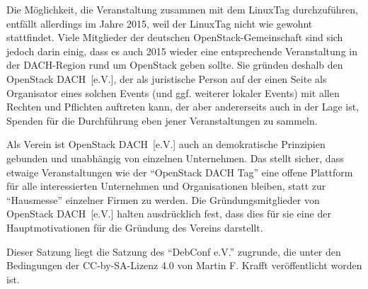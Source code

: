 \documentclass[draft]{scrartcl}
\newcommand{\VereinsName}{OpenStack DACH}
\begin{document}
Die Möglichkeit, die Veranstaltung zusammen mit dem LinuxTag durchzuführen,
entfällt allerdings im Jahre 2015, weil der LinuxTag nicht wie gewohnt
stattfindet. Viele Mitglieder der deutschen OpenStack-Gemeinschaft sind
sich jedoch darin einig, dass es auch 2015 wieder eine entsprechende
Veranstaltung in der DACH-Region rund um OpenStack geben sollte. Sie
gründen deshalb den \VereinsName\ [e.V.], der als juristische Person auf der
einen Seite als Organisator eines solchen Events (und ggf. weiterer
lokaler Events) mit allen Rechten und Pflichten auftreten kann, der aber
andererseits auch in der Lage ist, Spenden für die Durchführung eben jener
Veranstaltungen zu sammeln.

Als Verein ist \VereinsName\ [e.V.] auch an demokratische Prinzipien gebunden
und unabhängig von einzelnen Unternehmen. Das stellt sicher, dass etwaige
Veranstaltungen wie der "`OpenStack DACH Tag"' eine offene Plattform für alle
interessierten Unternehmen und Organisationen bleiben, statt zur "`Hausmesse"'
einzelner Firmen zu werden. Die Gründungsmitglieder von \VereinsName\ [e.V.]
halten ausdrücklich fest, dass dies für sie eine der Hauptmotivationen für die
Gründung des Vereins darstellt.

Dieser Satzung liegt die Satzung des "`DebConf e.V."' zugrunde, die unter
den Bedingungen der CC-by-SA-Lizenz 4.0 von Martin F. Krafft veröffentlicht
worden ist.

\normalsize
\end{document}
